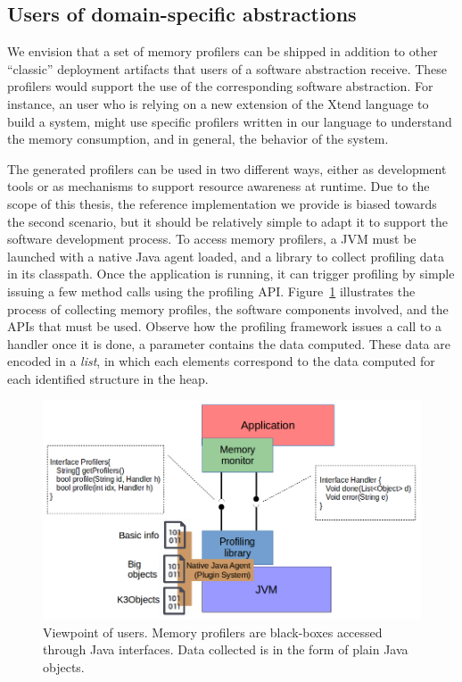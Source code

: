 \subsection{Users of domain-specific abstractions} \label{sec:dsl-tooling-users}

We envision that a set of memory profilers can be shipped in addition to other ``classic'' deployment artifacts that users of a software abstraction receive. 
These profilers would support the use of the corresponding software abstraction.
For instance, an user who is relying on a new extension of the Xtend language to build a system, might use specific profilers written in our language to understand the memory consumption, and in general, the behavior of the system.

The generated profilers can be used in two different ways, either as development tools or as mechanisms to support resource awareness at runtime.
Due to the scope of this thesis, the reference implementation we provide is biased towards the second scenario, but it should be relatively simple to adapt it to support the software development process.
To access memory profilers, a JVM must be launched with a native Java agent loaded, and a library to collect profiling data in its classpath.
Once the application is running, it can trigger profiling by simple issuing a few method calls using the profiling API.
Figure~\ref{fig:user-profiling-library-view} illustrates the process of collecting memory profiles, the software components involved, and the APIs that must be used.
Observe how the profiling framework issues a call to a handler once it is done, a parameter contains the data computed.
These data are encoded in a \textit{list}, in which each elements correspond to the data computed for each identified structure in the heap.

\begin{figure}[!b]
\centering
\includegraphics[scale=0.6]{./chapter6/fig/user-profiler-view.png}
\caption{Viewpoint of users. Memory profilers are black-boxes accessed through Java interfaces. Data collected is in the form of plain Java objects.}\label{fig:user-profiling-library-view}
\end{figure}


